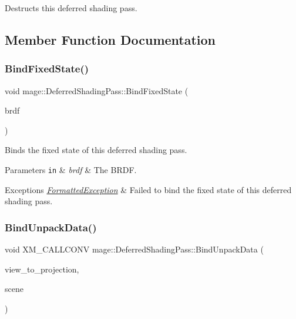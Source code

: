 Destructs this deferred shading pass. 

\subsection{Member Function Documentation}
\hypertarget{classmage_1_1_deferred_shading_pass_aa6e4edd14aeaf5388b1f57388dd3aa3e}{}\label{classmage_1_1_deferred_shading_pass_aa6e4edd14aeaf5388b1f57388dd3aa3e} 
\subsubsection{\texorpdfstring{Bind\+Fixed\+State()}{BindFixedState()}}
{\footnotesize\ttfamily void mage\+::\+Deferred\+Shading\+Pass\+::\+Bind\+Fixed\+State (\begin{DoxyParamCaption}\item[{\hyperlink{namespacemage_ae7a7a03a7b34d7e2689689bb8295cd38}{B\+R\+D\+F\+Type}}]{brdf }\end{DoxyParamCaption})}

Binds the fixed state of this deferred shading pass.


\begin{DoxyParams}[1]{Parameters}
\mbox{\tt in}  & {\em brdf} & The B\+R\+DF. \\
\hline
\end{DoxyParams}

\begin{DoxyExceptions}{Exceptions}
{\em \hyperlink{structmage_1_1_formatted_exception}{Formatted\+Exception}} & Failed to bind the fixed state of this deferred shading pass. \\
\hline
\end{DoxyExceptions}
\hypertarget{classmage_1_1_deferred_shading_pass_a58dfdd83a4ac7a8f95942ad5d9238ee1}{}\label{classmage_1_1_deferred_shading_pass_a58dfdd83a4ac7a8f95942ad5d9238ee1} 
\subsubsection{\texorpdfstring{Bind\+Unpack\+Data()}{BindUnpackData()}}
{\footnotesize\ttfamily void X\+M\+\_\+\+C\+A\+L\+L\+C\+O\+NV mage\+::\+Deferred\+Shading\+Pass\+::\+Bind\+Unpack\+Data (\begin{DoxyParamCaption}\item[{F\+X\+M\+M\+A\+T\+R\+IX}]{view\+\_\+to\+\_\+projection,  }\item[{const \hyperlink{structmage_1_1_pass_buffer}{Pass\+Buffer} $\ast$}]{scene }\end{DoxyParamCaption})\hspace{0.3cm}{\ttfamily [private]}}


